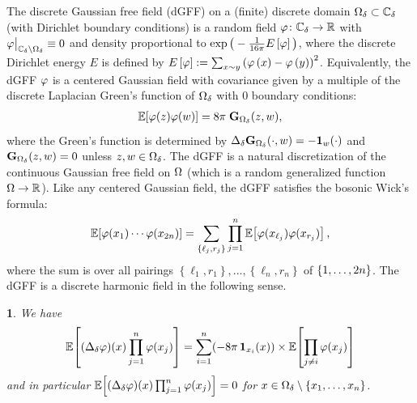 \documentclass[12pt,oneside,english]{amsart}
\numberwithin{equation}{section}
\numberwithin{figure}{section}
\theoremstyle{plain}
\theoremstyle{plain}
\theoremstyle{plain}
\theoremstyle{plain}
\newtheorem{lem}[thm]{\protect\lemmaname}
\theoremstyle{remark}
\theoremstyle{definition}
\theoremstyle{plain}
\theoremstyle{plain}
\numberwithin{thm}{section}
\providecommand{\lemmaname}{Lemma}
\providecommand{\lemmaname}{Lemma}
\providecommand{\lemmaname}{Lemma}
\providecommand{\lemmaname}{Lemma}
\begin{document}
The discrete Gaussian free field (dGFF) on a (finite) discrete domain
${{\Omega}}_{{\delta}}\subset{\mathbb{C}_{{\delta}}}$ (with Dirichlet boundary
conditions) is a random field ${\varphi} \colon {\mathbb{C}_{{\delta}}} \to  \mathbb{R}$
with ${\varphi}\big|_{{\mathbb{C}_{{\delta}}}\setminus{{\Omega}}_{{\delta}}}\equiv0$
and density proportional
to $\exp \big( -\frac{1}{16\pi} E\left[{\varphi}\right] \big)$, where the
discrete Dirichlet energy $E$ is defined by $E\left[{\varphi}\right]
:=\sum_{x\sim y}\left({\varphi}\left(x\right)-{\varphi}\left(y\right)\right)^{2}$.
Equivalently, the dGFF ${\varphi}$ is a centered Gaussian field with
covariance given by a multiple of the discrete Laplacian Green's 
function
of ${{\Omega}}_{{\delta}}$ with $0$ boundary conditions:
\begin{align*}
\mathbb{E} \! \left[ { {\varphi}(z) {\varphi}(w) } \right]
= 8 \pi \; \mathbf{G}_{{{\Omega}}_{{\delta}}}(z,w) ,
\end{align*}
where the Green's function is determined by
${\Delta}_{{\delta}} \mathbf{G}_{{{\Omega}}_{{\delta}}}(\cdot,w) = - \mathbf{1}_w(\cdot)$
and $\mathbf{G}_{{{\Omega}}_{{\delta}}}(z,w) = 0$ unless $z,w \in {{\Omega}}_{{\delta}}$.
The dGFF is a
natural discretization of the continuous Gaussian free field on ${\Omega} $
(which is a random generalized function ${\Omega}  \to  \mathbb{R}$). Like
any centered Gaussian field, the dGFF satisfies the bosonic Wick's
formula: 
\[
\mathbb{E} \! \left[ { {\varphi} (x_{1}) \cdots {\varphi} (x_{2n}) } \right]
= \sum_{\left\{ \ell_{j},r_{j}\right\}}
    \prod_{j=1}^{n} \mathbb{E} \! \left[ { {\varphi} (x_{\ell_{j}} )
        {\varphi} (x_{r_{j}}) } \right] ,
\]
where the sum is over all pairings
$\left\{ \ell_{1},r_{1}\right\} , \ldots , \left\{ \ell_{n},r_{n}\right\} $
of $\left\{  1, \ldots ,2n  \right\} $. The dGFF is a discrete harmonic
field in the following sense.
\begin{lem}\label{lem: Laplacian of dGFF is null}
We have 
\begin{align*} 
\mathbb{E} \! \left[ { ({\Delta}_{{\delta}} {\varphi}) (x)
    \prod_{j=1}^{n} {\varphi}(x_{j}) } \right]
= \sum_{i=1}^n (-8 \pi \, \mathbf{1}_{x_i}(x) ) \times 
    \mathbb{E} \! \left[ { \prod_{j\neq i} {\varphi}(x_{j}) } \right]
\end{align*}
and in particular $\mathbb{E} \! \left[ { ({\Delta}_{{\delta}} {\varphi}) (x)
    \prod_{j=1}^{n} {\varphi}(x_{j}) } \right] = 0$
for $x \in {{\Omega}}_{{\delta}} \setminus \left\{  x_{1}, \ldots, x_{n} \right\}$.
\end{lem}
\end{document}
